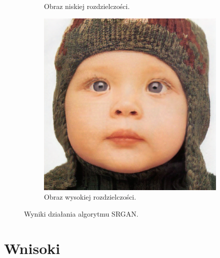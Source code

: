 \documentclass[a4paper,11pt, notitlepage ]{article}
\begin{document}
\begin{figure}[h!]
\begin{subfigure}[b]{0.4\linewidth}
		\caption{Obraz  niskiej rozdzielczości.}
	\end{subfigure}
	\begin{subfigure}[b]{0.4\linewidth}
		\includegraphics[width=\linewidth]{SRGAN/output_SRGAN.png}
		\caption{Obraz wysokiej rozdzielczości.}
	\end{subfigure}
	\caption{Wyniki działania algorytmu SRGAN.}
	\label{fig:coffee3}
\end{figure}
\newpage
\section{Wnisoki}
\end{document}

